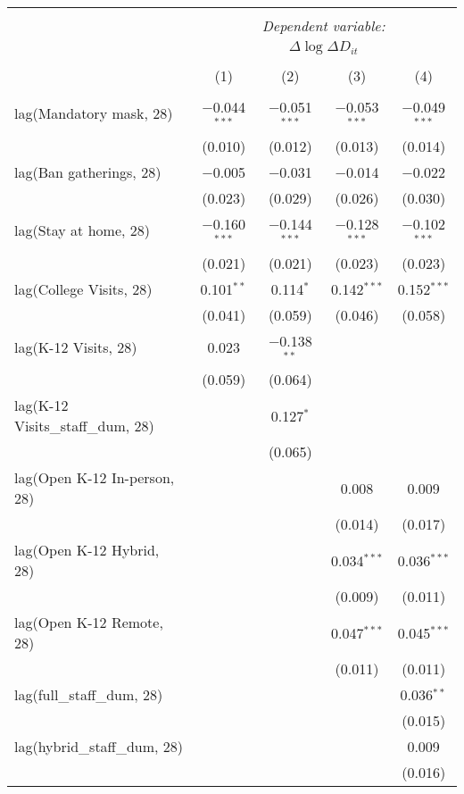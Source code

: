 \begin{tabular}{@{\extracolsep{1pt}}lcccc} 
\\[-1.8ex]\hline 
\hline \\[-1.8ex] 
 & \multicolumn{4}{c}{\textit{Dependent variable:}} \\ 
\cline{2-5} 
 & \multicolumn{4}{c}{$\Delta \log \Delta D_{it}$} \\ 
\\[-1.8ex] & (1) & (2) & (3) & (4)\\ 
\hline \\[-1.8ex] 
 lag(Mandatory mask, 28) & $-$0.044$^{***}$ & $-$0.051$^{***}$ & $-$0.053$^{***}$ & $-$0.049$^{***}$ \\ 
  & (0.010) & (0.012) & (0.013) & (0.014) \\ 
  lag(Ban gatherings, 28) & $-$0.005 & $-$0.031 & $-$0.014 & $-$0.022 \\ 
  & (0.023) & (0.029) & (0.026) & (0.030) \\ 
  lag(Stay at home, 28) & $-$0.160$^{***}$ & $-$0.144$^{***}$ & $-$0.128$^{***}$ & $-$0.102$^{***}$ \\ 
  & (0.021) & (0.021) & (0.023) & (0.023) \\ 
  lag(College Visits, 28) & 0.101$^{**}$ & 0.114$^{*}$ & 0.142$^{***}$ & 0.152$^{***}$ \\ 
  & (0.041) & (0.059) & (0.046) & (0.058) \\ 
  lag(K-12 Visits, 28) & 0.023 & $-$0.138$^{**}$ &  &  \\ 
  & (0.059) & (0.064) &  &  \\ 
  lag(K-12 Visits\_staff\_dum, 28) &  & 0.127$^{*}$ &  &  \\ 
  &  & (0.065) &  &  \\ 
  lag(Open K-12 In-person, 28) &  &  & 0.008 & 0.009 \\ 
  &  &  & (0.014) & (0.017) \\ 
  lag(Open K-12 Hybrid, 28) &  &  & 0.034$^{***}$ & 0.036$^{***}$ \\ 
  &  &  & (0.009) & (0.011) \\ 
  lag(Open K-12 Remote, 28) &  &  & 0.047$^{***}$ & 0.045$^{***}$ \\ 
  &  &  & (0.011) & (0.011) \\ 
  lag(full\_staff\_dum, 28) &  &  &  & 0.036$^{**}$ \\ 
  &  &  &  & (0.015) \\ 
  lag(hybrid\_staff\_dum, 28) &  &  &  & 0.009 \\ 
  &  &  &  & (0.016) \\ 

\end{tabular}
